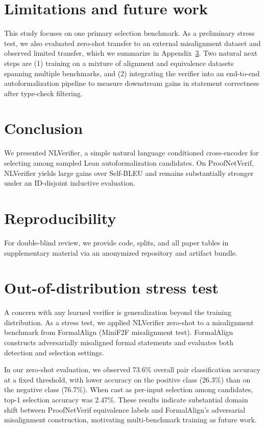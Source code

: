 \documentclass{article}
\begin{document}
\section{Limitations and future work}
This study focuses on one primary selection benchmark.
As a preliminary stress test, we also evaluated zero-shot transfer to an external misalignment dataset and observed limited transfer, which we summarize in Appendix~\ref{app:ood}.
Two natural next steps are (1) training on a mixture of alignment and equivalence datasets spanning multiple benchmarks, and (2) integrating the verifier into an end-to-end autoformalization pipeline to measure downstream gains in statement correctness after type-check filtering.

\section{Conclusion}
We presented NLVerifier, a simple natural language conditioned cross-encoder for selecting among sampled Lean autoformalization candidates.
On ProofNetVerif, NLVerifier yields large gains over Self-BLEU and remains substantially stronger under an ID-disjoint inductive evaluation.

\section*{Reproducibility}
For double-blind review, we provide code, splits, and all paper tables in supplementary material via an anonymized repository and artifact bundle.


\appendix

\section{Out-of-distribution stress test}
\label{app:ood}
A concern with any learned verifier is generalization beyond the training distribution.
As a stress test, we applied NLVerifier zero-shot to a misalignment benchmark from FormalAlign \citep{lu2024formalalign} (MiniF2F misalignment test).
FormalAlign constructs adversarially misaligned formal statements and evaluates both detection and selection settings.

In our zero-shot evaluation, we observed 73.6\% overall pair classification accuracy at a fixed threshold, with lower accuracy on the positive class (26.3\%) than on the negative class (76.7\%).
When cast as per-input selection among candidates, top-1 selection accuracy was 2.47\%.
These results indicate substantial domain shift between ProofNetVerif equivalence labels and FormalAlign's adversarial misalignment construction, motivating multi-benchmark training as future work.
\end{document}
